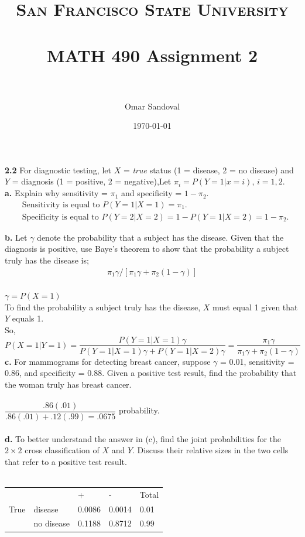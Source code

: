 \documentclass[paper=letter, fontsize=11pt]{scrartcl} %
\title{	
\normalfont \normalsize 
\textsc{San Francisco State University} \\ [25pt]
\horrule{0.5pt} \\[0.4cm] %
\huge MATH 490 Assignment 2  \\ %
\horrule{2pt} \\[0.5cm] %
}
\author{Omar Sandoval}
\date{\normalsize\today}
\begin{document}
\maketitle

\textbf{2.2} For diagnostic testing, let $X$ = \textit{true} status (1 = disease, 2 = no disease)
and $Y$ = diagnosis (1 = positive, 2 = negative),Let $\pi_i = P(Y = 1|x = i)$, $i = 1, 2$. \\

\textbf{a.} Explain why sensitivity = $\pi_1$ and specificity = $1 - \pi_2$.
\begin{align*}
	&\text{Sensitivity is equal to } P(Y = 1 | X = 1) = \pi_1. \\
	&\text{Specificity is equal to } P(Y = 2 | X = 2) = 1 - P(Y = 1 | X = 2) = 1 - \pi_2.
\end{align*}

\textbf{b.} Let $\gamma$ denote the probability that a subject has the disease. Given
that the diagnosis is positive, use Baye's theorem to show that the probability a
subject truly has the disease is;
\begin{align*}
	\pi_1\gamma/[\pi_1\gamma + \pi_2(1 - \gamma)]
\end{align*} \\
$\gamma = P(X = 1)$ \\

To find the probability a subject truly has the disease, $X$ must equal 1 given that $Y$ equals 1. \\
So, \\
$P(X = 1 | Y = 1) = \dfrac{P(Y = 1 | X = 1)\gamma}{P(Y = 1 | X = 1)\gamma + P(Y = 1 | X = 2)\gamma}
= \dfrac{\pi_1\gamma}{\pi_1\gamma + \pi_2(1 - \gamma)}$ \\

\textbf{c.} For mammograms for detecting breast cancer, suppose $\gamma$ = 0.01, sensitivity = 0.86,
and specificity = 0.88. Given a positive test result, find the probability that the woman truly
has breast cancer. \\
\\ 
$\dfrac{.86(.01)}{.86(.01) + .12(.99) = .0675}$ probability. \\
\\

\textbf{d.} To better understand the answer in (c), find the joint probabilities for the $2 \times 2$
cross classification of $X$ and $Y$. Discuss their relative sizes in the two cells that refer to 
a positive test result. \\
\\
\begin{table}[h]
\begin{tabular}{l|l|l|l|l}
     &            & +      & -      & Total \\
True & disease    & 0.0086 & 0.0014 & 0.01  \\
     & no disease & 0.1188 & 0.8712 & 0.99     
\end{tabular}
\end{table}
\end{document}
